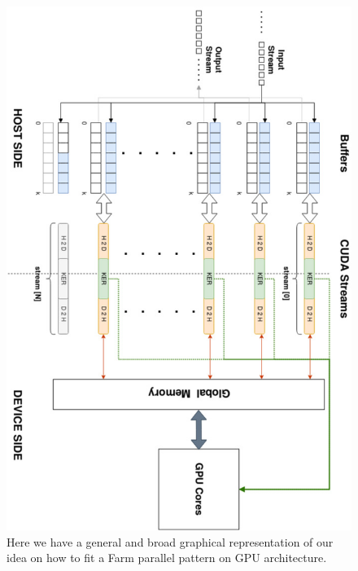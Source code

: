 		\begin{figure}
			\vspace{-2cm}
			\includegraphics[scale=0.62,angle=-90]{images/overallLogic.jpg}
			\caption{Here we have a general and broad graphical representation of our idea on how to fit a Farm parallel pattern on GPU architecture.}
			\label{fig:overallLogic}
			

		\end{figure}
		
		
				

